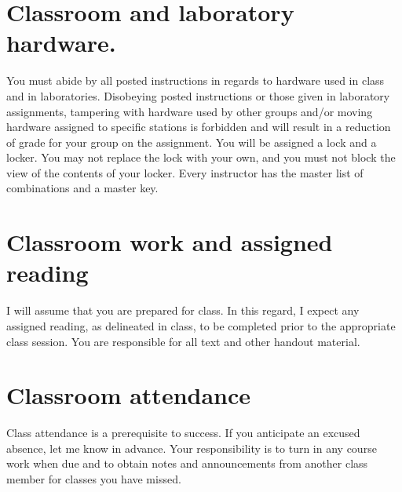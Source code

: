 \documentclass[11pt,courier]{navymemo}
\begin{document}
\section{Classroom and laboratory hardware.}
You must abide by all posted instructions in regards to hardware used in class and in laboratories. Disobeying posted instructions or those given in laboratory assignments, tampering with hardware used by other groups and/or moving hardware assigned to specific stations is forbidden and will result in a reduction of grade for your group on the assignment. You will be assigned a lock and a locker. You may not replace the lock with your own, and you must not block the view of the contents of your locker. Every instructor has the master list of combinations and a master key.
 
\section{Classroom work and assigned reading}
I will assume that you are prepared for class. In this regard, I expect any assigned reading, as delineated in class, to be completed prior to the appropriate class session. You are responsible for all text and other handout material.
 
\section{Classroom attendance}
Class attendance is a prerequisite to success. If you anticipate an excused absence, let me know in advance. Your responsibility is to turn in any course work when due and to obtain notes and announcements from another class member for classes you have missed.
 
\end{document}
